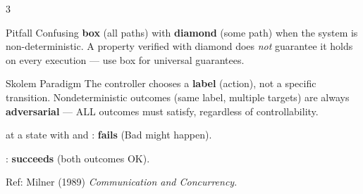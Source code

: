 \begin{multicols}{3}
\begin{warnbox}{Pitfall}
Confusing \textbf{box} (all paths) with \textbf{diamond} (some path) when the system is non-deterministic.  A property verified with diamond does \emph{not} guarantee it holds on every execution --- use box for universal guarantees.
\end{warnbox}

\begin{warnbox}{Skolem Paradigm}
The controller chooses a \textbf{label} (action), not a specific transition.
Nondeterministic outcomes (same label, multiple targets) are always
\textbf{adversarial} --- ALL outcomes must satisfy, regardless of
controllability.

 at a state with  and
: \textbf{fails} (Bad might happen).

: \textbf{succeeds} (both outcomes OK).

{\scriptsize Ref: Milner (1989) \textit{Communication and Concurrency}.}
\end{warnbox}

\end{multicols}

